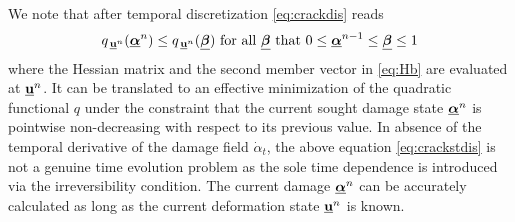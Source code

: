 We note that after temporal discretization \eqref{eq:crackdis} reads
\begin{equation} \label{eq:crackstdis}
q_{\,\uvec^n}(\dvec^n)\leq q_{\,\uvec^n}(\underline{\vec{\beta}}) \text{ for all $\underline{\vec{\beta}}$ that $0\leq\dvec^{n-1}\leq\underline{\vec{\beta}}\leq 1$}
\end{equation}
where the Hessian matrix and the second member vector in \eqref{eq:Hb} are evaluated at $\uvec^n$. It can be translated to an effective minimization of the quadratic functional $q$ under the constraint that the current sought damage state $\dvec^n$ is pointwise non-decreasing with respect to its previous value. In absence of the temporal derivative of the damage field $\dot{\alpha}_t$, the above equation \eqref{eq:crackstdis} is not a genuine time evolution problem as the sole time dependence is introduced via the irreversibility condition. The current damage $\dvec^n$ can be accurately calculated as long as the current deformation state $\uvec^n$ is known.

